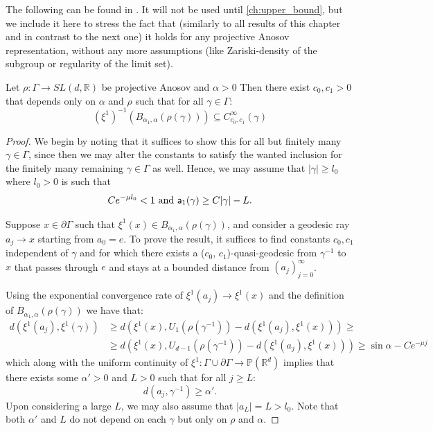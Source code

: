\documentclass{report}
\begin{document}
The following can be found in \cite[Proposition 3.3]{pozzetti_anosov_2023}.
It will not be used until \cref{ch:upper_bound}, but we include it here to stress the fact that (similarly to all results of this chapter and in contrast to the next one) it holds for any projective Anosov representation, without any more assumptions (like Zariski-density of the subgroup or regularity of the limit set).
\begin{proposition}\label{prop:shadows}
    Let $\rho: \Gamma \to SL(d, \mathbb R)$ be projective Anosov and $\alpha > 0$
    Then there exist $c_0, c_1 > 0$ that depends only on $\alpha$ and $\rho$ such that for all $\gamma \in \Gamma$:
    \[
        (\xi^1)^{-1}(B_{\alpha_1, \alpha}(\rho(\gamma))) \subseteq C_{c_0,c_1}^\infty(\gamma)
    \]
\end{proposition}
\begin{proof}
    We begin by noting that it suffices to show this for all but finitely many $\gamma \in \Gamma$, since then we may alter the constants to satisfy the wanted inclusion for the finitely many remaining $\gamma \in \Gamma$ as well. 
    Hence, we may assume that $|\gamma| \geq l_0$ where $l_0 > 0$ is such that 
    \[
        Ce^{-\mu l_0} < 1 \text{ and } {\sf a}_1(\gamma) \geq C|\gamma| - L.
    \]

    Suppose $x \in \partial \Gamma$ such that $\xi^1(x) \in B_{\alpha_1, \alpha}(\rho(\gamma))$, and consider a geodesic ray $a_j \to x$ starting from $a_0 = e$.
    To prove the result, it suffices to find constants $c_0, c_1$ independent of $\gamma$ and for which there exists a ($c_0$, $c_1$)-quasi-geodesic from $\gamma^{-1}$ to $x$ that passes through $e$ and stays at a bounded distance from $(a_j)_{j=0}^\infty$.

    Using the exponential convergence rate of $\xi^1(a_j) \to \xi^1(x)$ and the definition of $B_{\alpha_1, \alpha}(\rho(\gamma))$ we have that:
    \begin{align*}
        d(\xi^1(a_j), \xi^1(\gamma)) &\geq
        d(\xi^1(x), U_1(\rho(\gamma^{-1}))-d(\xi^1(a_j), \xi^1(x)))
        \geq \\
        &\geq
        d(\xi^1(x), U_{d-1}(\rho(\gamma^{-1}))-d(\xi^1(a_j), \xi^1(x)))
        \geq
        \sin \alpha - Ce^{-\mu j}
    \end{align*}
    which along with the uniform continuity of $\xi^1: \Gamma \cup \partial \Gamma \to \mathbb P(\mathbb R^d)$ implies that there exists some $\alpha' > 0$ and $L>0$ such that for all $j\geq L$:
    \[
        d(a_j, \gamma^{-1}) \geq \alpha'.
    \]
    Upon considering a large $L$, we may also assume that $|a_L| = L > l_0$. Note that both $\alpha'$ and $L$ do not depend on each $\gamma$ but only on $\rho$ and $\alpha$.


\end{proof}
\end{document}
